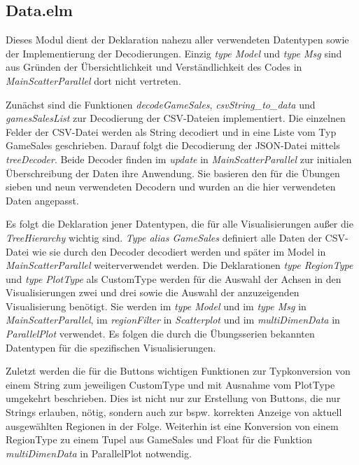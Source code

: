 \documentclass[usegeometry=true]{scrartcl}
\begin{document}
\subsection{Data.elm}
Dieses Modul dient der Deklaration nahezu aller verwendeten Datentypen sowie der Implementierung der Decodierungen. 
Einzig \textit{type Model} und \textit{type Msg} sind aus Gründen der Übersichtlichkeit und Verständlichkeit des Codes in \textit{MainScatterParallel} dort nicht vertreten. 

Zunächst sind die Funktionen \textit{decodeGameSales}, \textit{csvString\_to\_data} und \textit{gamesSalesList} zur Decodierung der CSV-Dateien implementiert. 
Die einzelnen Felder der CSV-Datei werden als String decodiert und in eine Liste vom Typ GameSales geschrieben.
Darauf folgt die Decodierung der JSON-Datei mittels \textit{treeDecoder}.
Beide Decoder finden im \textit{update} in \textit{MainScatterParallel} zur initialen Überschreibung der Daten ihre Anwendung.
Sie basieren den für die Übungen sieben und neun verwendeten Decodern und wurden an die hier verwendeten Daten angepasst.

Es folgt die Deklaration jener Datentypen, die für alle Visualisierungen außer die \textit{TreeHierarchy} wichtig sind. 
\textit{Type alias GameSales} definiert alle Daten der CSV-Datei wie sie durch den Decoder decodiert werden und später im Model in \textit{MainScatterParallel} weiterverwendet werden. 
Die Deklarationen \textit{type RegionType} und \textit{type PlotType} als CustomType werden für die Auswahl der Achsen in den Visualisierungen zwei und drei sowie die Auswahl der anzuzeigenden Visualisierung benötigt. 
Sie werden im \textit{type Model} und im \textit{type Msg} in \textit{MainScatterParallel}, im \textit{regionFilter} in \textit{Scatterplot} und im \textit{multiDimenData} in \textit{ParallelPlot} verwendet. 
Es folgen die durch die Übungsserien bekannten Datentypen für die spezifischen Visualisierungen. 

Zuletzt werden die für die Buttons wichtigen Funktionen zur Typkonversion von einem String zum jeweiligen CustomType und mit Ausnahme vom PlotType umgekehrt beschrieben. 
Dies ist nicht nur zur Erstellung von Buttons, die nur Strings erlauben, nötig, sondern auch zur bspw. korrekten Anzeige von aktuell ausgewählten Regionen in der Folge.
Weiterhin ist eine Konversion von einem RegionType zu einem Tupel aus GameSales und Float für die Funktion \textit{multiDimenData} in ParallelPlot notwendig.
\end{document}
